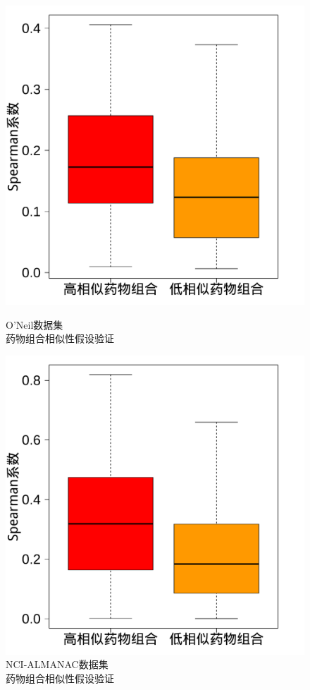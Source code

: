 \begin{figure}[H]
\centering
  \begin{minipage}{0.45\linewidth}
    \centering
    \includegraphics[width=\textwidth]{figures/O箱线图.pdf}
    \caption{O'Neil数据集\\药物组合相似性假设验证\label{fig:1g}}
  \end{minipage}%
  \begin{minipage}{0.45\linewidth}
    \centering
    \includegraphics[width=\textwidth]{figures/NCI箱线图.pdf}
    \caption{NCI-ALMANAC数据集\\药物组合相似性假设验证\label{fig:2g}}
  \end{minipage}
\end{figure}

